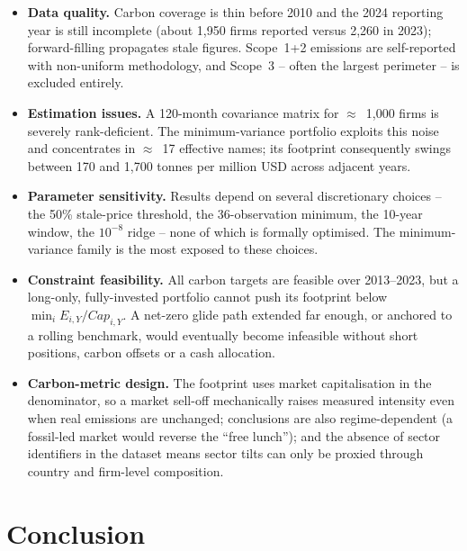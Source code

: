 \documentclass[11pt,a4paper]{article}
\begin{document}
\begin{itemize}[leftmargin=1.5em]
  \item \textbf{Data quality.} Carbon coverage is thin before 2010 and the 2024
        reporting year is still incomplete (about 1{,}950 firms reported versus
        2{,}260 in 2023); forward-filling propagates stale figures. Scope~1+2
        emissions are self-reported with non-uniform methodology, and Scope~3 --
        often the largest perimeter -- is excluded entirely.
  \item \textbf{Estimation issues.} A 120-month covariance matrix for
        $\approx$~1{,}000 firms is severely rank-deficient. The minimum-variance
        portfolio exploits this noise and concentrates in $\approx$~17 effective
        names; its footprint consequently swings between 170 and 1{,}700 tonnes
        per million USD across adjacent years.
  \item \textbf{Parameter sensitivity.} Results depend on several discretionary
        choices -- the 50\% stale-price threshold, the 36-observation minimum,
        the 10-year window, the $10^{-8}$ ridge -- none of which is formally
        optimised. The minimum-variance family is the most exposed to these
        choices.
  \item \textbf{Constraint feasibility.} All carbon targets are feasible over
        2013--2023, but a long-only, fully-invested portfolio cannot push its
        footprint below $\min_i E_{i,Y}/Cap_{i,Y}$. A net-zero glide path
        extended far enough, or anchored to a rolling benchmark, would
        eventually become infeasible without short positions, carbon offsets or
        a cash allocation.
  \item \textbf{Carbon-metric design.} The footprint uses market capitalisation
        in the denominator, so a market sell-off mechanically raises measured
        intensity even when real emissions are unchanged; conclusions are also
        regime-dependent (a fossil-led market would reverse the ``free lunch'');
        and the absence of sector identifiers in the dataset means sector tilts
        can only be proxied through country and firm-level composition.
\end{itemize}

\section{Conclusion}
\end{document}
